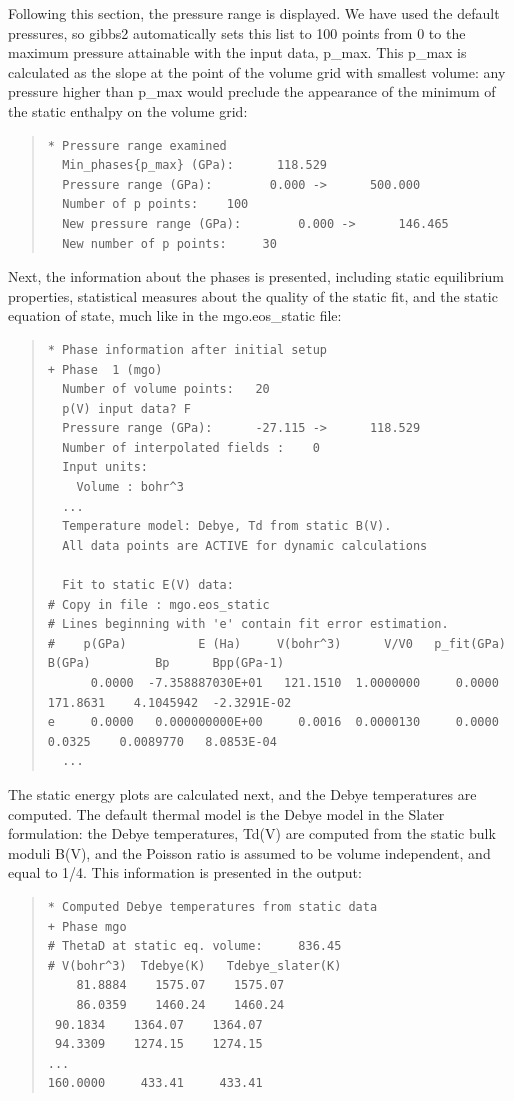 \documentclass[a4paper]{article}
\begin{document}
Following this section, the pressure range is displayed. We have
used the default pressures, so gibbs2 automatically sets this list to
100 points from 0 to the maximum pressure attainable with the input
data, p\_max. This p\_max is calculated as the slope at the point of the
volume grid with smallest volume: any pressure higher than p\_max would
preclude the appearance of the minimum of the static enthalpy on the
volume grid:
%
\begin{quote}
\begin{verbatim}
* Pressure range examined
  Min_phases{p_max} (GPa):      118.529
  Pressure range (GPa):        0.000 ->      500.000
  Number of p points:    100
  New pressure range (GPa):        0.000 ->      146.465
  New number of p points:     30
\end{verbatim}
\end{quote}

Next, the information about the phases is presented, including static
equilibrium properties, statistical measures about the quality of the
static fit, and the static equation of state, much like in the
mgo.eos\_static file:
%
\begin{quote}
\begin{verbatim}
* Phase information after initial setup
+ Phase  1 (mgo)
  Number of volume points:   20
  p(V) input data? F
  Pressure range (GPa):      -27.115 ->      118.529
  Number of interpolated fields :    0
  Input units:
    Volume : bohr^3
  ...
  Temperature model: Debye, Td from static B(V).
  All data points are ACTIVE for dynamic calculations

  Fit to static E(V) data:
# Copy in file : mgo.eos_static
# Lines beginning with 'e' contain fit error estimation.
#    p(GPa)          E (Ha)     V(bohr^3)      V/V0   p_fit(GPa)   B(GPa)         Bp      Bpp(GPa-1)
      0.0000  -7.358887030E+01   121.1510  1.0000000     0.0000   171.8631    4.1045942  -2.3291E-02
e     0.0000   0.000000000E+00     0.0016  0.0000130     0.0000     0.0325    0.0089770   8.0853E-04
  ...
\end{verbatim}
\end{quote}

The static energy plots are calculated next, and the Debye
temperatures are computed. The default thermal model is the Debye
model in the Slater formulation: the Debye temperatures, Td(V) are
computed from the static bulk moduli B(V), and the Poisson ratio is
assumed to be volume independent, and equal to 1/4. This information
is presented in the output:
%
\begin{quote}
\begin{verbatim}
* Computed Debye temperatures from static data
+ Phase mgo
# ThetaD at static eq. volume:     836.45
# V(bohr^3)  Tdebye(K)   Tdebye_slater(K)
    81.8884    1575.07    1575.07
    86.0359    1460.24    1460.24
 90.1834    1364.07    1364.07
 94.3309    1274.15    1274.15
...
160.0000     433.41     433.41
\end{verbatim}
\end{quote}
\end{document}
